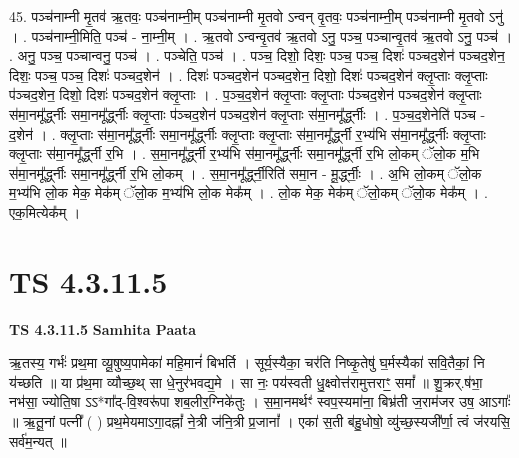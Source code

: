 \documentclass[17pt]{extarticle}
\begin{document}
45. पञ्च॑नाम्नी मृ॒तव॑ ऋ॒तवः॒ पञ्च॑नाम्नी॒म् पञ्च॑नाम्नी मृ॒तवो ऽन्वन् वृ॒तवः॒ पञ्च॑नाम्नी॒म् पञ्च॑नाम्नी मृ॒तवो ऽनु॑ । . पञ्च॑नाम्नी॒मिति॒ पञ्च॑ - ना॒म्नी॒म् । . ऋ॒तवो ऽन्वन्वृ॒तव॑ ऋ॒तवो ऽनु॒ पञ्च॒ पञ्चान्वृ॒तव॑ ऋ॒तवो ऽनु॒ पञ्च॑ । . अनु॒ पञ्च॒ पञ्चान्वनु॒ पञ्च॑ । . पञ्चेति॒ पञ्च॑ । . पञ्च॒ दिशो॒ दिशः॒ पञ्च॒ पञ्च॒ दिशः॑ पञ्चद॒शेन॑ पञ्चद॒शेन॒ दिशः॒ पञ्च॒ पञ्च॒ दिशः॑ पञ्चद॒शेन॑ । . दिशः॑ पञ्चद॒शेन॑ पञ्चद॒शेन॒ दिशो॒ दिशः॑ पञ्चद॒शेन॑ क्लृ॒प्ताः क्लृ॒प्ताः प॑ञ्चद॒शेन॒ दिशो॒ दिशः॑ पञ्चद॒शेन॑ क्लृ॒प्ताः । . प॒ञ्च॒द॒शेन॑ क्लृ॒प्ताः क्लृ॒प्ताः प॑ञ्चद॒शेन॑ पञ्चद॒शेन॑ क्लृ॒प्ताः स॑मा॒नमू᳚र्द्ध्नीः समा॒नमू᳚र्द्ध्नीः क्लृ॒प्ताः प॑ञ्चद॒शेन॑ पञ्चद॒शेन॑ क्लृ॒प्ताः स॑मा॒नमू᳚र्द्ध्नीः । . प॒ञ्च॒द॒शेनेति॑ पञ्च - द॒शेन॑ । . क्लृ॒प्ताः स॑मा॒नमू᳚र्द्ध्नीः समा॒नमू᳚र्द्ध्नीः क्लृ॒प्ताः क्लृ॒प्ताः स॑मा॒नमू᳚र्द्ध्नी र॒भ्य॑भि स॑मा॒नमू᳚र्द्ध्नीः क्लृ॒प्ताः क्लृ॒प्ताः स॑मा॒नमू᳚र्द्ध्नी र॒भि । . स॒मा॒नमू᳚र्द्ध्नी र॒भ्य॑भि स॑मा॒नमू᳚र्द्ध्नीः समा॒नमू᳚र्द्ध्नी र॒भि लो॒कम् ॅलो॒क म॒भि स॑मा॒नमू᳚र्द्ध्नीः समा॒नमू᳚र्द्ध्नी र॒भि लो॒कम् । . स॒मा॒नमू᳚र्द्ध्नी॒रिति॑ समा॒न - मू॒र्द्ध्नीः॒ । . अ॒भि लो॒कम् ॅलो॒क म॒भ्य॑भि लो॒क मेक॒ मेक॑म् ॅलो॒क म॒भ्य॑भि लो॒क मेक᳚म् । . लो॒क मेक॒ मेक॑म् ॅलो॒कम् ॅलो॒क मेक᳚म् । . एक॒मित्येक᳚म् । \newline
\pagebreak
{}

\section{ TS 4.3.11.5 }

\textbf{TS 4.3.11.5 } \newline
\textbf{Samhita Paata} \newline

ऋ॒तस्य॒ गर्भः॑ प्रथ॒मा व्यू॒षुष्य॒पामेका॑ महि॒मानं॑ बिभर्ति । सूर्य॒स्यैका॒ चर॑ति निष्कृ॒तेषु॑ घ॒र्मस्यैका॑ सवि॒तैकां॒ नि य॑च्छति ॥ या प्र॑थ॒मा व्यौच्छ॒थ् सा धे॒नुर॑भवद्य॒मे । सा नः॒ पय॑स्वती धु॒क्ष्वोत्त॑रामुत्तराꣳ॒॒ समां᳚ ॥ शु॒क्रर्.ष॑भा॒ नभ॑सा॒ ज्योति॒षा ऽऽ*गा᳚द्-वि॒श्वरू॑पा शब॒लीर॒ग्निके॑तुः । स॒मा॒नमर्थꣳ॑ स्वप॒स्यमा॑ना॒ बिभ्र॑ती ज॒राम॑जर उष॒ आऽगाः᳚ ॥ ऋ॒तू॒नां पत्नी᳚ ( ) प्रथ॒मेयमाऽगा॒दह्नां᳚ ने॒त्री ज॑नि॒त्री प्र॒जानां᳚ । एका॑ स॒ती ब॑हु॒धोषो॒ व्यु॑च्छ॒स्यजी᳚र्णा॒ त्वं ज॑रयसि॒ सर्व॑म॒न्यत् ॥ \newline
\end{document}
